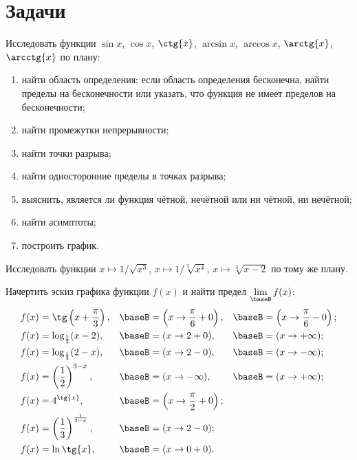\section{Задачи}
\begin{exersize}
	Исследовать функции $\sin{x}$, $\cos{x}$, $\ctg{x}$, $\arcsin{x}$, $\arccos{x}$, $\arctg{x}$, $\arcctg{x}$ по плану:
	\begin{enumerate}[1)]
		\item найти область определения; если область определения бесконечна, найти
			пределы на бесконечности или указать, что функция не имеет пределов на
			бесконечности;
		\item найти промежутки непрерывности;
		\item найти точки разрыва;
		\item найти односторонние пределы в точках разрыва;
		\item выяснить, является ли функция чётной, нечётной или ни чётной, ни
			нечётной;
		\item найти асимптоты;
		\item построить график.
	\end{enumerate}
\end{exersize}

\begin{exersize}
	Исследовать функции $x \mapsto 1/\sqrt{x^3}$, $x \mapsto 1/\sqrt[5]{x^4}$, $x
	\mapsto \sqrt[3]{x-2}$ по тому же плану.
\end{exersize}

\begin{exersize}
	Начертить эскиз графика функции $f(x)$ и найти предел $\lim\limits_{\baseB} f(x)$:
	\begin{align*}
		f(x) &= \tg \left( x + \frac{\pi}{3} \right), &
		\baseB &= \left( x \to \frac{\pi}{6} + 0 \right), &
		\baseB &= \left( x \to \frac{\pi}{6} - 0 \right);
		\\
		f(x) &= \log_{\frac{1}{3}} (x-2), &
		\baseB &= (x \to 2+0), &
		\baseB &= (x \to +\infty);
		\\
		f(x) &= \log_{\frac{1}{3}} (2-x), &
		\baseB &= (x \to 2-0), &
		\baseB &= (x \to -\infty);
		\\
		f(x) &= \left( \frac{1}{2} \right)^{3-x}, &
		\baseB &= (x \to -\infty), &
		\baseB &= (x \to +\infty);
		\\
		f(x) &= 4^{\tg{x}}, &
		\baseB &= \left( x \to \frac{\pi}{2} + 0 \right);
		\\
		f(x) &= \left( \frac{1}{3} \right)^{\frac{1}{2-x}}, &
		\baseB &= (x \to 2 - 0);
		\\
		f(x) &= \ln{\tg{x}}, &
		\baseB &= (x \to 0+0).
	\end{align*}
\end{exersize}

